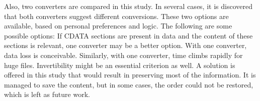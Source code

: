 Also, two converters are compared in this study.  In several cases, it is
discovered that both converters suggest different conversions. These two options
are available, based on personal preferences and logic. The following are some
possible options: If CDATA sections are present in data and the content of these
sections is relevant, one converter may be a better option. With one converter,
data loss is conceivable. Similarly, with one converter, time climbs rapidly for
huge files. Invertibility might be an essential criterion as well. A solution is
offered in this study that would result in preserving most of the information.
It is managed to save the content, but in some cases, the order could not be
restored, which is left as future work.